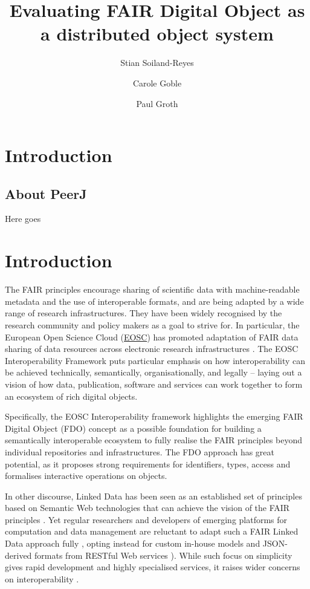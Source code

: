 \documentclass[fleqn,10pt,lineno]{wlpeerj}
\title{Evaluating FAIR Digital Object as a distributed object system}
\author[1,2]{Stian Soiland-Reyes}
\author[1]{Carole Goble}
\author[2]{Paul Groth}
\affil[1]{Department of Computer Science, The University of Manchester, UK}
\affil[2]{Informatics Institute, Faculty of Science, University of Amsterdam, NL }
\begin{document}
\flushbottom
\maketitle
\thispagestyle{empty}

\section*{Introduction}




\subsection*{About PeerJ}


Here goes

\hypertarget{sec:introduction}{%
\section*{Introduction}\label{sec:introduction}}

The FAIR principles \cite{6DjakjNS} encourage sharing of scientific data with machine-readable metadata and the use of interoperable formats, and are being adapted by a wide range of research infrastructures. They have been widely recognised by the research community and policy makers as a goal to strive for. In particular, the European Open Science Cloud (\href{https://www.eosc.eu/}{EOSC}) has promoted adaptation of FAIR data sharing of data resources across electronic research infrastructures \cite{u8Cy0psL}. The EOSC Interoperability Framework \cite{aCye3KpE} puts particular emphasis on how interoperability can be achieved technically, semantically, organisationally, and legally -- laying out a vision of how data, publication, software and services can work together to form an ecosystem of rich digital objects.

Specifically, the EOSC Interoperability framework highlights the emerging FAIR Digital Object \cite{IHLT6hye} (FDO) concept as a possible foundation for building a semantically interoperable ecosystem to fully realise the FAIR principles beyond individual repositories and infrastructures. The FDO approach has great potential, as it proposes strong requirements for identifiers, types, access and formalises interactive operations on objects.

In other discourse, Linked Data \cite{19s3yyxDn} has been seen as an established set of principles based on Semantic Web technologies that can achieve the vision of the FAIR principles \cite{EJDjHrUv,GJHYN6xW}. Yet regular researchers and developers of emerging platforms for computation and data management are reluctant to adapt such a FAIR Linked Data approach fully \cite{jHwttlTs}, opting instead for custom in-house models and JSON-derived formats from RESTful Web services \cite{99MS5xE0,J2H8yssV}). While such focus on simplicity gives rapid development and highly specialised services, it raises wider concerns on interoperability \cite{DNTCUjpC,Pa67pUtR}.
\end{document}
